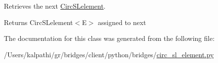 Retrieves the next \hyperlink{classbridges_1_1circ__sl__element_1_1_circ_s_lelement}{Circ\+S\+Lelement}. 

\begin{DoxyReturn}{Returns}
Circ\+S\+Lelement$<$\+E$>$ assigned to next 
\end{DoxyReturn}


The documentation for this class was generated from the following file\+:\begin{DoxyCompactItemize}
\item 
/\+Users/kalpathi/gr/bridges/client/python/bridges/\hyperlink{circ__sl__element_8py}{circ\+\_\+sl\+\_\+element.\+py}\end{DoxyCompactItemize}
